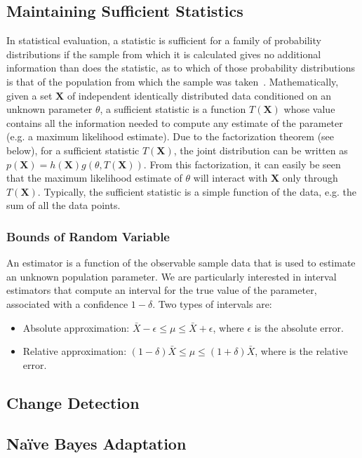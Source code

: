\documentclass[a4paper, 11pt, oneside]{book}
\begin{document}
\subsection{Maintaining Sufficient Statistics}
In statistical evaluation, a statistic is sufficient for a family of probability distributions if the sample from which it is calculated gives no additional information than does the statistic, as to which of those probability distributions is that of the population from which the sample was taken~\cite{fisher22:suffstat}. Mathematically, given a set  $\mathbf{X}$ of independent identically distributed data conditioned on an unknown parameter $\theta$, a sufficient statistic is a function $T(\mathbf{X})$ whose value contains all the information needed to compute any estimate of the parameter (e.g. a maximum likelihood estimate). Due to the factorization theorem (see below), for a sufficient statistic $T(\mathbf{X})$, the joint distribution can be written as $ p(\mathbf{X}) = h(\mathbf{X}) g(\theta, T(\mathbf{X}))$. From this factorization, it can easily be seen that the maximum likelihood estimate of $\theta$ will interact with $\mathbf{X}$ only through $T(\mathbf{X})$. Typically, the sufficient statistic is a simple function of the data, e.g. the sum of all the data points.

\subsubsection{Bounds of Random Variable}
An estimator is a function of the observable sample data that is used to
estimate an unknown population parameter. We are particularly interested in interval estimators that compute an interval for the true value of the parameter, associated with a confidence $1 - \delta$. Two types of intervals are:

\begin{itemize}	
	\item Absolute approximation: $\bar{X} - \epsilon \le \mu \le \bar{X} + \epsilon$, where $\epsilon$ is the absolute error.
	\item Relative approximation: $(1 - \delta)\bar{X} \le \mu \le (1 + \delta)\bar{X}$, where  is the relative error.
\end{itemize}

\subsection{Change Detection}
\subsection{Na\"ive Bayes Adaptation}
\end{document}
